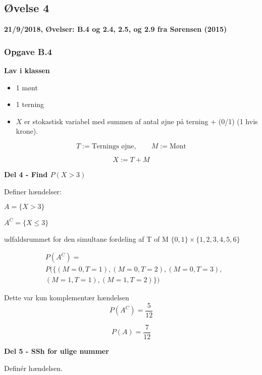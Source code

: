 \subsection{Øvelse 4}

\textbf{21/9/2018, Øvelser: B.4  og 2.4, 2.5, og 2.9 fra Sørensen (2015)}

\subsubsection{Opgave B.4}

\textbf{Lav i klassen}

\begin{itemize}
    \item 1 mønt
    \item 1 terning
    \item $X$ er stokastisk variabel med summen af antal øjne på terning + (0/1) (1 hvis krone).
\end{itemize}

\begin{equation}
    T := \text{Ternings øjne}, \qquad M := \text{Mønt}
\end{equation}

\begin{equation}
    X := T + M
\end{equation}

\textbf{Del 4 - Find $P(X>3)$}

Definer hændelser:

$A = \{ X>3 \} $

$A^{C} = \{ X \leq 3 \}$

udfaldsrummet for den simultane fordeling af T of M $\{0, 1\} \times \{1, 2, 3, 4, 5, 6 \}$


\begin{align}
    &P(A^{C}) = \\ &P(\{(M=0, T=1), (M=0, T=2), (M=0, T=3), \\ &(M=1, T=1), (M=1, T=2)\})
\end{align}

Dette var kun komplementær hændelsen
\begin{equation}
    P(A^{C}) = \frac{5}{12}
\end{equation}


\begin{equation}
    P(A) = \frac{7}{12}
\end{equation}

\textbf{Del 5 - SSh for ulige nummer}

Definér hændelsen.

